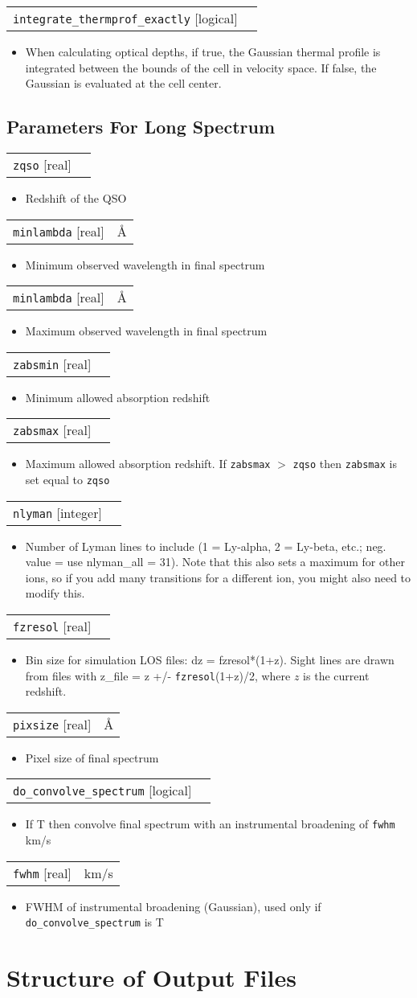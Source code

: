 \documentclass{report}
\makeatletter
\newcommand{\paramdefinition}[3]{
\begin{tabular*}{\textwidth}{l@{\extracolsep{\fill}}r}
		{\tt #1} [{\sc #2}]& #3 \\
\end{tabular*}}
\newcommand{\paramdescription}[1]{
\begin{itemize}
\item #1
\end{itemize}\vspace{0.2cm}}
\makeatother
\begin{document}
\paramdefinition{integrate\_thermprof\_exactly}{logical}{}
\paramdescription{When calculating optical depths, if true, the Gaussian thermal profile is integrated between the bounds of the cell in velocity space. If false, the Gaussian is evaluated at the cell center.}


\section{Parameters For Long Spectrum}

\paramdefinition{zqso}{real}{}
\paramdescription{Redshift of the QSO}

\paramdefinition{minlambda}{real}{\AA{}}
\paramdescription{Minimum observed wavelength in final spectrum}

\paramdefinition{minlambda}{real}{\AA{}}
\paramdescription{Maximum observed wavelength in final spectrum}

\paramdefinition{zabsmin}{real}{}
\paramdescription{Minimum allowed absorption redshift}

\paramdefinition{zabsmax}{real}{}
\paramdescription{Maximum allowed absorption redshift.  If {\tt zabsmax} $>$ {\tt zqso} then {\tt zabsmax} is set equal to {\tt zqso}}

\paramdefinition{nlyman}{integer}{}
\paramdescription{Number of Lyman lines to include (1 = Ly-alpha, 2 = Ly-beta, etc.; neg. value = use nlyman\_all = 31). Note that this also sets a maximum for other ions, so if you add many transitions for a different ion, you might also need to modify this.}

\paramdefinition{fzresol}{real}{}
\paramdescription{Bin size for simulation LOS files: dz = fzresol*(1+z). Sight lines are drawn from files with z\_file = z +/- {\tt fzresol}(1+z)/2, where $z$ is the current redshift.}

\paramdefinition{pixsize}{real}{\AA{}}
\paramdescription{Pixel size of final spectrum}

\paramdefinition{do\_convolve\_spectrum}{logical}{}
\paramdescription{If T then convolve final spectrum with an instrumental broadening of {\tt fwhm} km/s}

\paramdefinition{fwhm}{real}{km/s}
\paramdescription{FWHM of instrumental broadening (Gaussian), used only if {\tt do\_convolve\_spectrum} is T}


\chapter{Structure of Output Files}
\end{document}
